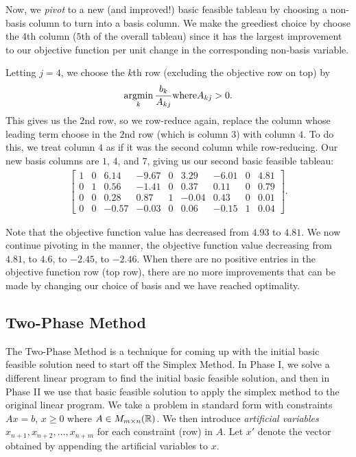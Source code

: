 Now, we \emph{pivot} to a new (and improved!) basic feasible tableau by choosing a non-basis column to turn into a basis column. We make the greediest choice by choose the $4$th column ($5$th of the overall tableau) since it has the largest improvement to our objective function per unit change in the corresponding non-basis variable.

Letting $j = 4$, we choose the $k$th row (excluding the objective row on top) by \[\operatorname*{argmin}_{k}\frac{b_k}{A_{kj}} \mathrm{ where } A_{kj} > 0.\] This gives us the $2$nd row, so we row-reduce again, replace the column whose leading term choose in the $2$nd row (which is column $3$) with column $4$. To do this, we treat column $4$ as if it was the second column while row-reducing. Our new basis columns are $1$, $4$, and $7$, giving us our second basic feasible tableau:
\begin{align*}
    \left[\begin{array}{c|ccccccc|c}
        1 & 0 & 6.14  & -9.67 & 0 & 3.29  & -6.01 & 0 & 4.81 \\
        \hline
        0 & 1 & 0.56  & -1.41 & 0 & 0.37  & 0.11  & 0 & 0.79 \\
        0 & 0 & 0.28  & 0.87  & 1 & -0.04 & 0.43  & 0 & 0.01 \\
        0 & 0 & -0.57 & -0.03 & 0 & 0.06  & -0.15 & 1 & 0.04
    \end{array}\right].
\end{align*}

Note that the objective function value has decreased from $4.93$ to $4.81$. We now continue pivoting in the manner, the objective function value decreasing from $4.81$, to $4.6$, to $-2.45$, to $-2.46$. When there are no positive entries in the objective function row (top row), there are no more improvements that can be made by changing our choice of basis and we have reached optimality.

\subsection{Two-Phase Method}

The Two-Phase Method is a technique for coming up with the initial basic feasible solution need to start off the Simplex Method. In Phase I, we solve a different linear program to find the initial basic feasible solution, and then in Phase II we use that basic feasible solution to apply the simplex method to the original linear program. We take a problem in standard form with constraints $Ax = b$, $x \geq 0$ where $A \in M_{m \times n}(\mathbb{R})$. We then introduce \emph{artificial variables} $x_{n+1}, x_{n+2}, \ldots, x_{n+m}$ for each constraint (row) in $A$. Let $x'$ denote the vector obtained by appending the artificial variables to $x$.

